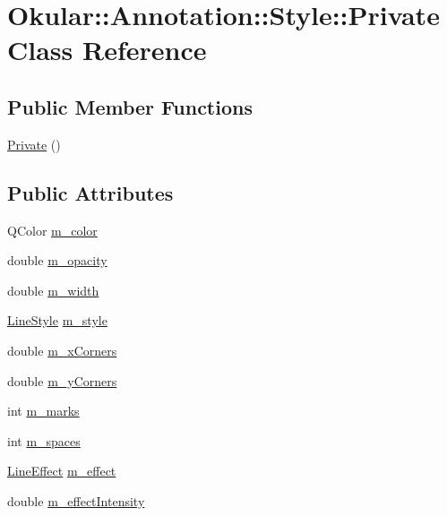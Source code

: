 \hypertarget{classAnnotation_1_1Style_1_1Private}{\section{Okular\+:\+:Annotation\+:\+:Style\+:\+:Private Class Reference}
\label{classAnnotation_1_1Style_1_1Private}
}
\subsection*{Public Member Functions}
\begin{DoxyCompactItemize}
\item 
\hyperlink{classAnnotation_1_1Style_1_1Private_a8a4e6bae356a4a94390b453cd73b8b46}{Private} ()
\end{DoxyCompactItemize}
\subsection*{Public Attributes}
\begin{DoxyCompactItemize}
\item 
Q\+Color \hyperlink{classAnnotation_1_1Style_1_1Private_a4a2db0519a6cecbea22de950f62947ba}{m\+\_\+color}
\item 
double \hyperlink{classAnnotation_1_1Style_1_1Private_aa951a265f67ab46849e2b68329258b97}{m\+\_\+opacity}
\item 
double \hyperlink{classAnnotation_1_1Style_1_1Private_a0cae4e3136dd86eba05cec2c278b5ba8}{m\+\_\+width}
\item 
\hyperlink{classOkular_1_1Annotation_ac60f5de2d449043f9f849f3f081f8a7a}{Line\+Style} \hyperlink{classAnnotation_1_1Style_1_1Private_aa10ac5df077d063eeca3cc2b9ab0de6e}{m\+\_\+style}
\item 
double \hyperlink{classAnnotation_1_1Style_1_1Private_a49fd6ed3b60ba42106bff4274eadca6f}{m\+\_\+x\+Corners}
\item 
double \hyperlink{classAnnotation_1_1Style_1_1Private_ac90f79f3f0714b3fb9bd7439f9cc5275}{m\+\_\+y\+Corners}
\item 
int \hyperlink{classAnnotation_1_1Style_1_1Private_abec0c309c4ac4820d943157c0e897fdb}{m\+\_\+marks}
\item 
int \hyperlink{classAnnotation_1_1Style_1_1Private_a4a25c7757d7fc2a026d4377f1d47abb4}{m\+\_\+spaces}
\item 
\hyperlink{classOkular_1_1Annotation_a9083f89e7bb24e972852685dd2c6176e}{Line\+Effect} \hyperlink{classAnnotation_1_1Style_1_1Private_a50de9cc6a403082df92c6cabfbff3316}{m\+\_\+effect}
\item 
double \hyperlink{classAnnotation_1_1Style_1_1Private_af9edd4fe699dde5625fde82953f7814f}{m\+\_\+effect\+Intensity}
\end{DoxyCompactItemize}


